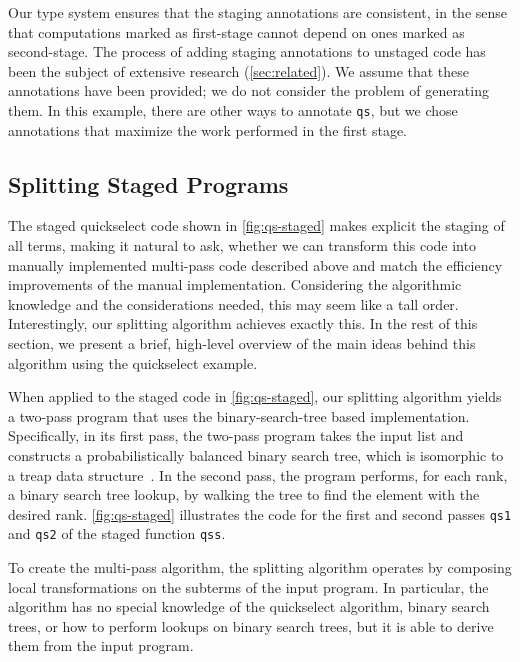 \begin{abstrsyn}
Our type system ensures that the staging annotations are consistent,
in the sense that computations marked as first-stage cannot depend on
ones marked as second-stage.
%
The process of adding staging annotations to unstaged code has been
the subject of extensive research (\ref{sec:related}). We assume that
these annotations have been provided; we do not consider the problem
of generating them. In this example, there are other ways to annotate
\texttt{qs}, but we chose annotations that maximize the work performed
in the first stage.


\subsection{Splitting Staged Programs}



The staged quickselect code shown in \ref{fig:qs-staged} makes
explicit the staging of all terms, making it natural to ask, whether
we can transform this code into manually implemented multi-pass code
described above and match the efficiency improvements of the manual
implementation. Considering the algorithmic knowledge and the
considerations needed, this may seem like a tall order.
Interestingly, our splitting algorithm achieves exactly this.
In the rest of this section, we present a brief, high-level overview
of the main ideas behind this algorithm using the quickselect example.
%

When applied to the staged code in \ref{fig:qs-staged}, our splitting
algorithm yields a two-pass program that uses the binary-search-tree
based implementation.  Specifically, in its first pass, the two-pass
program takes the input list and constructs a probabilistically
balanced binary search tree, which is isomorphic to a treap data
structure~\cite{SeidelAr96}.  In the second pass, the program performs,
for each rank, a binary search tree lookup, by walking the tree to
find the element with the desired rank.
%
\ref{fig:qs-staged} illustrates the code for the first and second
passes \texttt{qs1} and \texttt{qs2} of the staged function
\texttt{qss}.


To create the multi-pass algorithm, the splitting algorithm operates
by composing local transformations on the subterms of the input
program.  In particular, the algorithm has no special knowledge of the
quickselect algorithm, binary search trees, or how to perform lookups
on binary search trees, but it is able to derive them from the input
program.
%


\end{abstrsyn}
